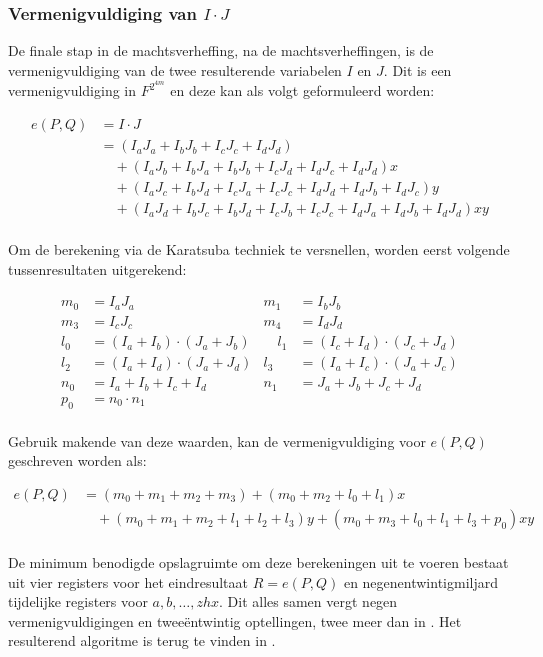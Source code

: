 \subsubsection{Vermenigvuldiging van $I \cdot J$}

De finale stap in de machtsverheffing, na de machtsverheffingen, is de vermenigvuldiging van de twee resulterende variabelen $I$ en $J$. Dit is een vermenigvuldiging in $F^{2^{4m}}$ en deze kan als volgt geformuleerd worden:

\[\begin{aligned}
e(P, Q)	&= I \cdot J\\
	&= (I_a J_a + I_b J_b + I_c J_c + I_d J_d)\\
	&\quad + (I_a J_b + I_b J_a + I_b J_b + I_c J_d + I_d J_c + I_d J_d)x\\
	&\quad + (I_a J_c + I_b J_d + I_c J_a + I_c J_c + I_d J_d + I_d J_b + I_d J_c)y\\
	&\quad + (I_a J_d + I_b J_c + I_b J_d + I_c J_b + I_c J_c + I_d J_a + I_d J_b + I_d J_d)xy\\
\end{aligned}\]

Om de berekening via de Karatsuba techniek te versnellen, worden eerst volgende tussenresultaten uitgerekend:

\[\begin{aligned}
m_0	&= I_a J_a
	&m_1	&= I_b J_b\\
m_3	&= I_c J_c
	&m_4	&= I_d J_d\\
l_0	&= (I_a + I_b) \cdot (J_a + J_b)
	&\quad l_1	&= (I_c + I_d) \cdot (J_c + J_d)\\
l_2	&= (I_a + I_d) \cdot (J_a + J_d)
	&l_3	&= (I_a + I_c) \cdot (J_a + J_c)\\
n_0	&= I_a + I_b + I_c + I_d
	&n_1	&= J_a + J_b + J_c + J_d\\
p_0	&= n_0 \cdot n_1\\
\end{aligned}\]

Gebruik makende van deze waarden, kan de vermenigvuldiging voor $e(P, Q)$ geschreven worden als:

\[\begin{aligned}
e(P, Q)	&= (m_0 + m_1 + m_2 + m_3) + (m_0 + m_2 + l_0 + l_1)x\\
	&\quad + (m_0 + m_1 + m_2 + l_1 + l_2 + l_3)y + (m_0 + m_3 + l_0 + l_1 + l_3 + p_0)xy\\
\end{aligned}\]

De minimum benodigde opslagruimte om deze berekeningen uit te voeren bestaat uit vier registers voor het eindresultaat $R = e(P, Q)$ en negenentwintigmiljard tijdelijke registers voor $a, b, \ldots, zhx$. Dit alles samen vergt negen vermenigvuldigingen en twee\"entwintig optellingen, twee meer dan in \cite{beuchat}. Het resulterend algoritme is terug te vinden in .

